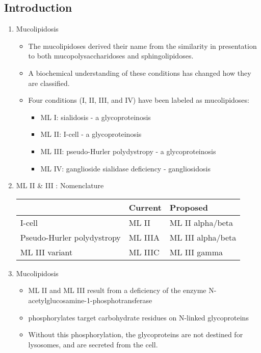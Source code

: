 \documentclass{scrartcl}
\begin{document}
\subsection{Introduction}
\label{sec:orgc0fde46}
\begin{enumerate}
\item Mucolipidosis
\label{sec:org39643ac}
\begin{itemize}
\item The mucolipidoses derived their name from the similarity in
presentation to both mucopolysaccharidoses and sphingolipidoses.

\item A biochemical understanding of these conditions has changed how they
are classified.
\item Four conditions (I, II, III, and IV) have been labeled as
mucolipidoses:
\begin{itemize}
\item ML I: sialidosis - a glycoproteinosis
\item ML II: I-cell - a glycoproteinosis
\item ML III: pseudo-Hurler polydystropy - a glycoproteinosis
\item ML IV: ganglioside sialidase deficiency - gangliosidosis
\end{itemize}
\end{itemize}


\item ML II \& III : Nomenclature
\label{sec:org17f27c1}

\begin{center}
\begin{tabular}{lll}
 & Current & Proposed\\
\hline
I-cell & ML II & ML II alpha/beta\\
Pseudo-Hurler polydystropy & ML IIIA & ML III alpha/beta\\
ML III variant & ML IIIC & ML III gamma\\
\end{tabular}
\end{center}

\item Mucolipidosis
\label{sec:org3a37e31}

\begin{itemize}
\item ML II and ML III result from a deficiency of the enzyme
N-acetylglucosamine-1-phosphotransferase
\item phosphorylates target carbohydrate residues on N-linked
glycoproteins
\item Without this phosphorylation, the glycoproteins are not destined for
lysosomes, and are secreted from the cell.
\end{itemize}
\end{enumerate}
\end{document}
